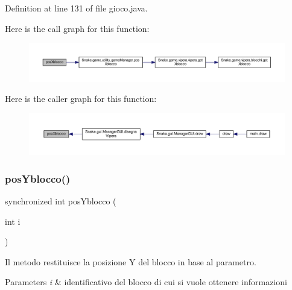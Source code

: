 Definition at line 131 of file gioco.\+java.

Here is the call graph for this function\+:
\nopagebreak
\begin{figure}[H]
\begin{center}
\leavevmode
\includegraphics[width=350pt]{class_snake_1_1game_1_1gioco_adaf82eb9ab0c17af1f56016eff67aa1d_cgraph}
\end{center}
\end{figure}
Here is the caller graph for this function\+:
\nopagebreak
\begin{figure}[H]
\begin{center}
\leavevmode
\includegraphics[width=350pt]{class_snake_1_1game_1_1gioco_adaf82eb9ab0c17af1f56016eff67aa1d_icgraph}
\end{center}
\end{figure}
\mbox{\label{class_snake_1_1game_1_1gioco_a6ced36b3bedd58f6363c964edb3b9b8d}} 
\subsubsection{\texorpdfstring{pos\+Yblocco()}{posYblocco()}}
{\footnotesize\ttfamily synchronized int pos\+Yblocco (\begin{DoxyParamCaption}\item[{int}]{i }\end{DoxyParamCaption})}



Il metodo restituisce la posizione Y del blocco in base al parametro. 


\begin{DoxyParams}{Parameters}
{\em i} & identificativo del blocco di cui si vuole ottenere informazioni \\
\hline
\end{DoxyParams}


